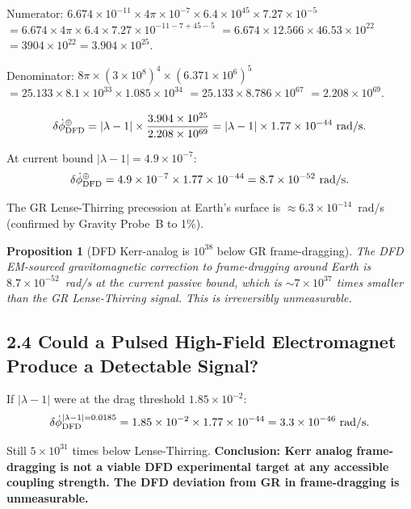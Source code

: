 \documentclass[11pt,twocolumn]{article}
\newcommand{\lam}{\lambda}
\newtheorem{proposition}{Proposition}
\begin{document}
Numerator: $6.674\times10^{-11}\times4\pi\times10^{-7}
\times6.4\times10^{45}\times7.27\times10^{-5}$
$= 6.674\times4\pi\times6.4\times7.27\times10^{-11-7+45-5}$
$= 6.674\times12.566\times46.53\times10^{22}$
$= 3904\times10^{22} = 3.904\times10^{25}$.

Denominator: $8\pi\times(3\times10^8)^4\times(6.371\times10^6)^5$
$= 25.133\times8.1\times10^{33}\times1.085\times10^{34}$
$= 25.133\times8.786\times10^{67}$
$= 2.208\times10^{69}$.

\begin{equation}
\delta\dot\phi_{\rm DFD}^\oplus
= |\lam-1|\times\frac{3.904\times10^{25}}{2.208\times10^{69}}
= |\lam-1|\times1.77\times10^{-44}~\text{rad/s}.
\label{eq:earth_gm_result}
\end{equation}

At current bound $|\lam-1| = 4.9\times10^{-7}$:
\begin{equation}
\delta\dot\phi_{\rm DFD}^\oplus = 4.9\times10^{-7}
\times1.77\times10^{-44}
= 8.7\times10^{-52}~\text{rad/s}.
\end{equation}

The GR Lense-Thirring precession at Earth's surface is
$\approx 6.3\times10^{-14}$~rad/s (confirmed by Gravity Probe~B to 1\%).

\begin{proposition}[DFD Kerr-analog is $10^{38}$ below GR frame-dragging]
The DFD EM-sourced gravitomagnetic correction to frame-dragging around
Earth is $8.7\times10^{-52}$~rad/s at the current passive bound,
which is $\sim 7\times10^{37}$ times smaller than the GR Lense-Thirring
signal. This is irreversibly unmeasurable.
\label{prop:kerr}
\end{proposition}

\subsection*{2.4 Could a Pulsed High-Field Electromagnet Produce a Detectable
Signal?}

If $|\lam-1|$ were at the drag threshold $1.85\times10^{-2}$:
\begin{equation}
\delta\dot\phi_{\rm DFD}^{|\lam-1|=0.0185}
= 1.85\times10^{-2}\times1.77\times10^{-44}
= 3.3\times10^{-46}~\text{rad/s}.
\end{equation}

Still $5\times10^{31}$ times below Lense-Thirring. \textbf{Conclusion: Kerr
analog frame-dragging is not a viable DFD experimental target at any
accessible coupling strength. The DFD deviation from GR in frame-dragging
is unmeasurable.}
\end{document}
